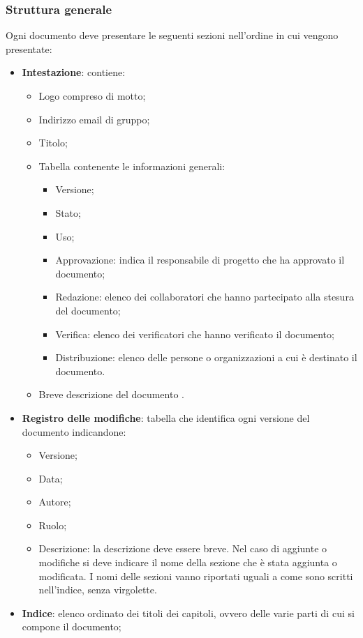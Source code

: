 \subsubsection{Struttura generale}
Ogni documento deve presentare le seguenti sezioni nell'ordine in cui vengono presentate:
\begin{itemize} 
    \item \textbf{Intestazione}:
    contiene:
    \begin{itemize} 
        \item Logo compreso di motto;
        \item Indirizzo email di gruppo; 
        \item Titolo;
        \item Tabella contenente le informazioni generali:
        \begin{itemize}
            \item Versione;
            \item Stato;
            \item Uso;
            \item Approvazione: indica il responsabile di progetto che ha approvato il documento; 
            \item Redazione: elenco dei collaboratori che hanno partecipato alla stesura del documento;
            \item Verifica: elenco dei verificatori che hanno verificato il documento;
            \item Distribuzione: elenco delle persone o organizzazioni a cui è destinato il documento.
        \end{itemize}
        \item Breve descrizione del documento .
    \end{itemize}
    \item \textbf{Registro delle modifiche}:
    tabella che identifica ogni versione del documento indicandone:
    \begin{itemize} 
        \item Versione;
        \item Data;
        \item Autore;
        \item Ruolo;
        \item Descrizione: la descrizione deve essere breve. Nel caso di aggiunte o modifiche si deve indicare 
        il nome della sezione che è stata aggiunta o modificata. 
        I nomi delle sezioni vanno riportati uguali a come sono scritti nell'indice, 
        senza virgolette.
    \end{itemize}
    \item \textbf{Indice}:
    elenco ordinato dei titoli dei capitoli, ovvero delle varie parti di cui si compone il documento;
    

\end{itemize}
